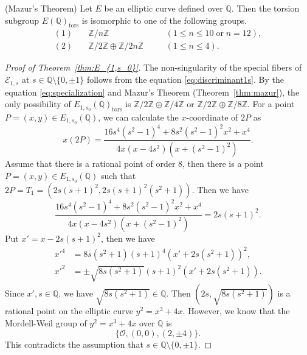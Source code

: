 \documentclass[main]{subfiles}
\begin{document}
\begin{thm}{(Mazur's Theorem)}
    \label{thm:mazur}
    Let $E$ be an elliptic curve defined over $\mathbb{Q}$.
    Then the torsion subgroup $E(\mathbb{Q})_{\text{tors}}$ is isomorphic to one of the following groups.
    \begin{align*}
        (1) & \quad \mathbb{Z} / n \mathbb{Z} \quad                                   &  & (1 \leq n \leq 10 \; \text{or}\; n = 12), \\
        (2) & \quad \mathbb{Z} / 2 \mathbb{Z} \oplus \mathbb{Z} / 2n \mathbb{Z} \quad &  & (1 \leq n \leq 4).
    \end{align*}
\end{thm}

\begin{proof}[Proof of Theorem~{\ref{thm:E_{1,s_0}}}]
    The non-singularity of the special fibers of $\mathcal{E}_{1,s}$ at $s\in \mathbb{Q}\setminus \{0,\pm 1\}$ follows from the equation \eqref{eq:discriminant1s}.
    By the equation \eqref{eq:specialization} and Mazur's Theorem (Theorem~\ref{thm:mazur}), the only possibility of $E_{1,s_0}(\mathbb{Q})_{\text{tors}}$ is $\mathbb{Z} / 2 \mathbb{Z} \oplus \mathbb{Z} / 4 \mathbb{Z}$ or $\mathbb{Z} / 2 \mathbb{Z} \oplus \mathbb{Z} / 8 \mathbb{Z}$.
    For a point $P=(x,y) \in E_{1,s_0}(\mathbb{Q})$, we can calculate the $x$-coordinate of $2P$ as
    \begin{equation*}
        x(2P) = \frac{16s^{4}(s^{2} - 1)^{4} + 8 s^{2}(s^{2} - 1)^{2} x^{2} + x^{4}}{4 x (x - 4s^{2}) (x + (s^{2} - 1)^{2})}.
    \end{equation*}
    Assume that there is a rational point of order $8$, then there is a point $P=(x,y) \in E_{1,s_0}(\mathbb{Q})$ such that $2P = T_1 = (2s(s+1)^2, 2s(s+1)^2(s^2+1))$.
    Then we have
    \begin{equation*}
        \frac{16s^{4}(s^{2} - 1)^{4} + 8 s^{2}(s^{2} - 1)^{2} x^{2} + x^{4}}{4 x (x - 4s^{2}) (x + (s^{2} - 1)^{2})} = 2s(s+1)^2.
    \end{equation*}
    Put $x' = x - 2s(s+1)^2$, then we have
    \begin{align*}
        x'^4 &= 8s(s^{2} + 1)(s + 1)^{4}(x' + 2s(s^2+1))^{2},\\
        x'^2 &= \pm \sqrt{8 s (s^2 + 1)} (s+1)^{2} (x' + 2s(s^2+1)).
    \end{align*}
    Since $x', s \in \mathbb{Q}$, we have $\sqrt{8 s (s^2 + 1)} \in \mathbb{Q}$.
    Then $(2s, \sqrt{8 s (s^2 + 1)})$ is a rational point on the elliptic curve $y^2 = x^3 + 4x$.
    However, we know that the Mordell-Weil group of $y^2 = x^3 + 4x$ over $\mathbb{Q}$ is
    \begin{equation*}
        \{ \mathcal{O}, (0,0), (2,\pm 4) \}.
    \end{equation*}
    This contradicts the assumption that $s\in \mathbb{Q} \setminus \{0,\pm 1\}$.
\end{proof}
\end{document}
